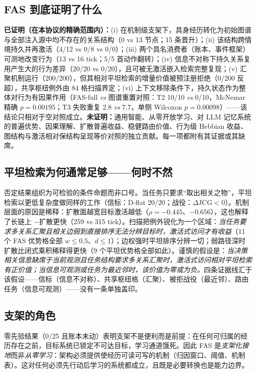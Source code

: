\documentclass[10pt,a4paper]{ctexart}
\begin{document}
\subsection{FAS 到底证明了什么}
\textbf{已证明（在本协议的精确范围内）：}(i) 在机制级支架下，具身经历转化为初始图谱与全部注入源中均不存在的关系结构（0 vs 13 节点；15 条晋升）；(ii) 该结构跨情境持久并再激活（4/12 vs 0/8 vs 0/0）；(iii) 两个具名消费者（账本、事件框架）可测地改变行为（13 vs 16 tick；5/5 首动作翻转）；(iv) 信息不对称下持久关系复用产生大的行为差异（20/20 vs 0/20），且可被无激活嵌入检索完整复现；(v) 汇聚机制运行（200/200），但其相对平坦检索的增量价值被预注册拒绝（0/200 反超），共享枢纽例外由 84 格扫描界定；(vi) 上下文移除条件下，持久状态作为整体对行为有因果作用（FAS-full \emph{vs} 图谱重置对照：T2 10/10 \emph{vs} 0/10，McNemar 精确 $p{=}0.00195$；T3 失败重复 2.8 \emph{vs} 7.7，单侧 Wilcoxon $p{=}0.00098$）——该结论只相对于空对照成立。\textbf{未证明：}通用智能、从零开放学习、对 LLM 记忆系统的普遍优势、因果理解、扩散普遍收益、稳健路由价值、行为级 Hebbian 收益、图结构与激活相对保结构呈现等价对照的独立贡献。每一项都附有其证据或其缺席。

\subsection{平坦检索为何通常足够——何时不然}
否定结果组织为可检验的条件命题而非口号。当任务只要求“取出相关之物”，平坦检索以更低复杂度做同样的工作（信标：D-flat 20/20；战役：$\Delta$JCG${<}0$）。机制层面的原因是稀释：扩散面越宽目标激活越低（$\rho{=}{-}0.445$、${-}0.656$），这也解释了长链上 $-$扩散更快（259 vs 315 tick）。扫描把例外锐化为一个区域：\emph{当任务要求多关系汇聚且相关边弱到直接排序无法分辨目标时，激活式访问才有收益}（11 个 FAS 优势格全部 $w{\le}0.5$、$d{\le}1$）；边权强时平坦排序分辨一切；弱路径深时扩散比闭式乘积稀释得更快（9 个平坦优势格全部如此）。谨慎的假设是：\emph{当决策相关信息缺席于当前观测且任务结构要求多关系汇聚时，激活式访问相对平坦检索有正价值；当信息可观测或任务为最近邻时，该价值为零或为负。}四条证据线汇于该假设——信标（信息不对称）、共享枢纽格（汇聚）、被拒战役（最近邻）、路由任务（信息可观测）——没有一条单独盖印。

\subsection{支架的角色}
零先验结果（0/25 且账本未动）表明支架不是便利而是前提：在任何可归属的经历存在之前，目标系统已锁定不可达目标，学习通道饿死。因此 FAS 是\emph{支架化接地}而非\emph{从零学习}：架构必须提供使经历可读可写的机制（归因窗口、阈值、机制表）。这对任何必须先行动后学习的系统都成立，且既是必要转换也是能力边界。
\end{document}
